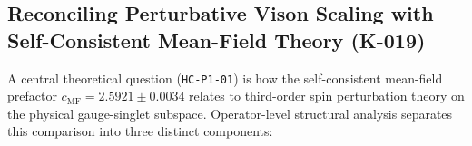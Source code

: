 

\subsection{Reconciling Perturbative Vison Scaling with Self-Consistent Mean-Field Theory (K-019)}
\label{sec:m1_6_perturbative_reconciliation}

A central theoretical question (\texttt{HC-P1-01}) is how the self-consistent mean-field prefactor $c_{\mathrm{MF}} = 2.5921 \pm 0.0034$ relates to third-order spin perturbation theory on the physical gauge-singlet subspace. Operator-level structural analysis separates this comparison into three distinct components:
